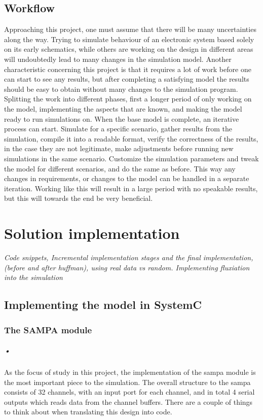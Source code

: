 \documentclass[a4paper, 12pt]{report}\dfrac{\right }{•}
\begin{document}
\section{Workflow}
Approaching this project, one must assume that there will be many uncertainties along the way.
Trying to simulate behaviour of an electronic system based solely on its early schematics, while others are working on the design in different areas will undoubtedly lead to many changes in the simulation model.
Another characteristic concerning this project is that it requires a lot of work before one can start to see any results, but after completing a satisfying  model the results should be easy to obtain without many changes to the simulation program.
Splitting the work into different phases, first a longer period of only working on the model, implementing the aspects that are known, and making the model ready to run simulations on.
When the base model is complete, an iterative process can start.
Simulate for a specific scenario, gather results from the simulation, compile it into a readable format, verify the correctness of the results, in the case they are not legitimate, make adjustments before running new simulations in the same scenario.
Customize the simulation parameters and tweak the model for different scenarios, and do the same as before.
This way any changes in requirements, or changes to the model can be handled in a separate iteration.
Working like this will result in a large period with no speakable results, but this will towards the end be very beneficial.

\chapter{Solution implementation}
\textit{Code snippets, Incremental implementation stages and the final implementation, (before and after huffman), using real data vs random. Implementing fluxiation into the simulation}
\section{Implementing the model in SystemC}

\subsection{The SAMPA module}

\paragraph{•}
As the focus of study in this project, the implementation of the \gls{sampa} module is the most important piece to the simulation.
The overall structure to the \gls{sampa} consists of 32 channels, with an input port for each channel, and in total 4 serial outputs which reads data from the channel buffers.
There are a couple of things to think about when translating this design into code.
\end{document}
